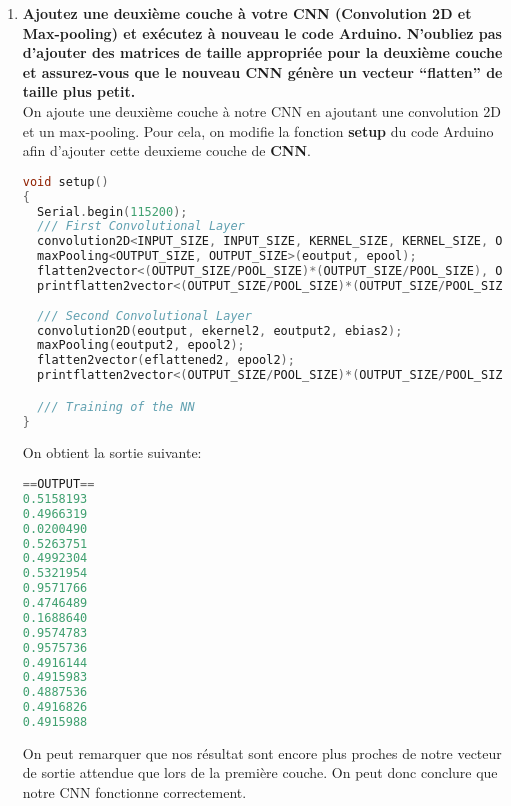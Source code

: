 \begin{enumerate}
{\begin{lstlisting}[language=C]
0.4928572
0.5052462
0.4997209
    \end{lstlisting}
    On remarque imédiatement que l'on obtient des valeurs très proches de notre vecteur de sortie attendue. 
    On peut donc conclure que notre CNN fonctionne correctement.
  } \\
  \item {
    \textbf{Ajoutez une deuxième couche à votre CNN (Convolution 2D et Max-pooling) et
    exécutez à nouveau le code Arduino. N'oubliez pas d'ajouter des matrices de taille
    appropriée pour la deuxième couche et assurez-vous que le nouveau CNN génère un
    vecteur ``flatten'' de taille plus petit.} \vspace{0.2cm} \\
    On ajoute une deuxième couche à notre CNN en ajoutant une convolution 2D et un max-pooling. Pour cela,
    on modifie la fonction \textbf{setup} du code Arduino afin d'ajouter cette deuxieme couche de \textbf{CNN}.
    \begin{lstlisting}[language=C]
void setup()
{
  Serial.begin(115200);
  /// First Convolutional Layer
  convolution2D<INPUT_SIZE, INPUT_SIZE, KERNEL_SIZE, KERNEL_SIZE, OUTPUT_SIZE, OUTPUT_SIZE>(einput, ekernel, eoutput, ebias);
  maxPooling<OUTPUT_SIZE, OUTPUT_SIZE>(eoutput, epool);
  flatten2vector<(OUTPUT_SIZE/POOL_SIZE)*(OUTPUT_SIZE/POOL_SIZE), OUTPUT_SIZE/POOL_SIZE, OUTPUT_SIZE/POOL_SIZE>(eflattened, epool);
  printflatten2vector<(OUTPUT_SIZE/POOL_SIZE)*(OUTPUT_SIZE/POOL_SIZE)>(eflattened);
  
  /// Second Convolutional Layer
  convolution2D(eoutput, ekernel2, eoutput2, ebias2);
  maxPooling(eoutput2, epool2);
  flatten2vector(eflattened2, epool2);
  printflatten2vector<(OUTPUT_SIZE/POOL_SIZE)*(OUTPUT_SIZE/POOL_SIZE)>(eflattened2);

  /// Training of the NN
}
    \end{lstlisting}
    On obtient la sortie suivante:
    \begin{lstlisting}[language=C]
==OUTPUT==
0.5158193
0.4966319
0.0200490
0.5263751
0.4992304
0.5321954
0.9571766
0.4746489
0.1688640
0.9574783
0.9575736
0.4916144
0.4915983
0.4887536
0.4916826
0.4915988
    \end{lstlisting}
    On peut remarquer que nos résultat sont encore plus proches de notre vecteur de sortie attendue que lors de la première couche. 
    On peut donc conclure que notre CNN fonctionne correctement.
  }

\end{enumerate}